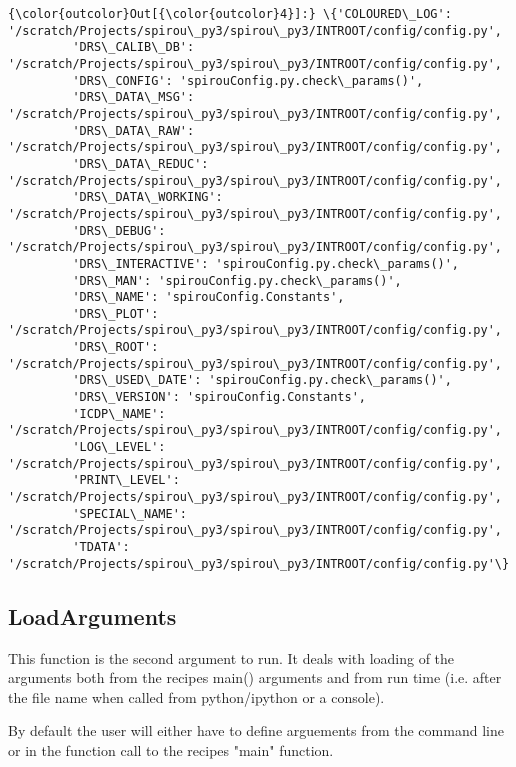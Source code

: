 \documentclass[11pt]{article}
\begin{document}
\begin{Verbatim}[commandchars=\\\{\}]
{\color{outcolor}Out[{\color{outcolor}4}]:} \{'COLOURED\_LOG': '/scratch/Projects/spirou\_py3/spirou\_py3/INTROOT/config/config.py',
         'DRS\_CALIB\_DB': '/scratch/Projects/spirou\_py3/spirou\_py3/INTROOT/config/config.py',
         'DRS\_CONFIG': 'spirouConfig.py.check\_params()',
         'DRS\_DATA\_MSG': '/scratch/Projects/spirou\_py3/spirou\_py3/INTROOT/config/config.py',
         'DRS\_DATA\_RAW': '/scratch/Projects/spirou\_py3/spirou\_py3/INTROOT/config/config.py',
         'DRS\_DATA\_REDUC': '/scratch/Projects/spirou\_py3/spirou\_py3/INTROOT/config/config.py',
         'DRS\_DATA\_WORKING': '/scratch/Projects/spirou\_py3/spirou\_py3/INTROOT/config/config.py',
         'DRS\_DEBUG': '/scratch/Projects/spirou\_py3/spirou\_py3/INTROOT/config/config.py',
         'DRS\_INTERACTIVE': 'spirouConfig.py.check\_params()',
         'DRS\_MAN': 'spirouConfig.py.check\_params()',
         'DRS\_NAME': 'spirouConfig.Constants',
         'DRS\_PLOT': '/scratch/Projects/spirou\_py3/spirou\_py3/INTROOT/config/config.py',
         'DRS\_ROOT': '/scratch/Projects/spirou\_py3/spirou\_py3/INTROOT/config/config.py',
         'DRS\_USED\_DATE': 'spirouConfig.py.check\_params()',
         'DRS\_VERSION': 'spirouConfig.Constants',
         'ICDP\_NAME': '/scratch/Projects/spirou\_py3/spirou\_py3/INTROOT/config/config.py',
         'LOG\_LEVEL': '/scratch/Projects/spirou\_py3/spirou\_py3/INTROOT/config/config.py',
         'PRINT\_LEVEL': '/scratch/Projects/spirou\_py3/spirou\_py3/INTROOT/config/config.py',
         'SPECIAL\_NAME': '/scratch/Projects/spirou\_py3/spirou\_py3/INTROOT/config/config.py',
         'TDATA': '/scratch/Projects/spirou\_py3/spirou\_py3/INTROOT/config/config.py'\}
\end{Verbatim}
            
    \subsection{LoadArguments}\label{loadarguments}

    This function is the second argument to run. It deals with loading of
the arguments both from the recipes main() arguments and from run time
(i.e. after the file name when called from python/ipython or a console).

By default the user will either have to define arguements from the
command line or in the function call to the recipes "main" function.
\end{document}
